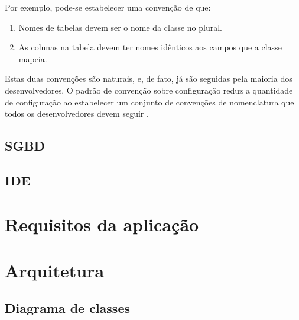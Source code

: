 Por exemplo, pode-se estabelecer uma convenção de que:
\begin{enumerate}
\item Nomes de tabelas devem ser o nome da classe no plural.
\item As colunas na tabela devem ter nomes idênticos aos campos que a classe mapeia.
\end{enumerate}

Estas duas convenções são naturais, e, de fato, já são seguidas pela maioria dos desenvolvedores.
O padrão de convenção sobre configuração reduz a quantidade de configuração ao estabelecer
um conjunto de convenções de nomenclatura que todos os desenvolvedores devem seguir \cite{Chen}.

\subsection{SGBD}
\subsection{IDE}

\section{Requisitos da aplicação}


\section{Arquitetura}
\subsection{Diagrama de classes}
